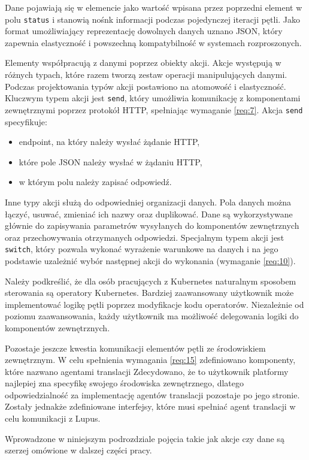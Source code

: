 Dane pojawiają się w elemencie jako wartość wpisana przez poprzedni element w polu \texttt{status} i stanowią nośnk informacji podczas pojedynczej iteracji pętli. Jako format umożliwiający reprezentację dowolnych danych uznano JSON, który zapewnia elastyczność i powszechną kompatybilność w systemach rozproszonych.

Elementy współpracują z danymi poprzez obiekty akcji. Akcje występują w różnych typach, które razem tworzą zestaw operacji manipulujących danymi. Podczas projektowania typów akcji postawiono na atomowość i elastyczność. Kluczwym typem akcji jest \texttt{send}, który umożliwia komunikację z komponentami zewnętrznymi poprzez protokół HTTP, spełniając wymaganie \ref{req:7}. Akcja \texttt{send} specyfikuje:
\begin{itemize}
    \item endpoint, na który należy wysłać żądanie HTTP,
    \item które pole JSON należy wysłać w żądaniu HTTP,
    \item w którym polu należy zapisać odpowiedź.
\end{itemize}


Inne typy akcji służą do odpowiedniej organizacji danych. Pola danych można łączyć, usuwać, zmieniać ich nazwy oraz duplikować. Dane są wykorzystywane głównie do zapisywania parametrów wysyłanych do komponentów zewnętrznych oraz przechowywania otrzymanych odpowiedzi. Specjalnym typem akcji jest \texttt{switch}, który pozwala wykonać wyrażenie warunkowe na danych i na jego podstawie uzależnić wybór następnej akcji do wykonania (wymaganie \ref{req:10}).

Należy podkreślić, że dla osób pracujących z Kubernetes naturalnym sposobem sterowania są operatory Kubernetes. Bardziej zaawansowany użytkownik może implementować logikę pętli poprzez modyfikacje kodu operatorów. Niezależnie od poziomu zaawansowania, każdy użytkownik ma możliwość delegowania logiki do komponentów zewnętrznych.

Pozostaje jeszcze kwestia komunikacji elementów pętli ze środowiskiem zewnętrznym. W celu spełnienia wymagania \ref{req:15} zdefiniowano komponenty, które nazwano agentami translacji Zdecydowano, że to użytkownik platformy najlepiej zna specyfikę swojego środowiska zewnętrznego, dlatego odpowiedzialność za implementację agentów translacji pozostaje po jego stronie. Zostały jednakże zdefiniowane interfejsy, które musi spełniać agent translacji w celu komunikacji z Lupus.

Wprowadzone w niniejszym podrozdziale pojęcia takie jak akcje czy dane są szerzej omówione w dalszej części pracy. 

